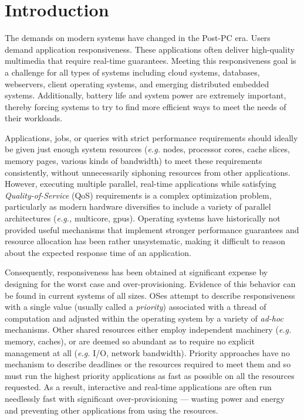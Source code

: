 \section{Introduction}


The demands on modern systems have changed in the Post-PC era.  Users demand application responsiveness. These applications often deliver high-quality multimedia that require real-time guarantees.  Meeting this responsiveness goal is a challenge for all types of systems including cloud systems, databases, webservers, client operating systems, and emerging distributed embedded systems. Additionally, battery life and system power are extremely important, thereby forcing systems to try to find more efficient ways to meet the needs of their workloads.

Applications, jobs, or queries with strict performance requirements should ideally be given just enough system resources (\emph{e.g.} nodes, processor cores, cache slices, memory pages, various kinds of bandwidth) to meet these requirements consistently, without unnecessarily siphoning resources from other applications. However, executing multiple parallel, real-time applications while satisfying  \emph{Quality-of-Service} (QoS) requirements is a complex optimization problem, particularly as modern hardware diversifies to include a variety of parallel architectures (\emph{e.g.,} multicore, gpus).  Operating systems have historically not provided useful mechanisms that implement stronger performance guarantees and resource allocation has been rather unsystematic, making it difficult to reason about the expected response time of an application.

Consequently, responsiveness has been obtained at significant expense by designing for the worst case and over-provisioning.  Evidence of this behavior can be found in current systems of all sizes.  OSes attempt to describe responsiveness with a single value (usually called a \emph{priority}) associated with a thread of computation and adjusted within the operating system by a variety of \emph{ad-hoc} mechanisms. Other shared resources either employ independent machinery (\emph{e.g.} memory, caches), or are deemed so abundant as to require no explicit management at all (\emph{e.g.} I/O, network bandwidth).
 Priority approaches have no mechanism to describe deadlines or the resources required to meet them and so must run the highest priority applications as fast as possible on all the resources requested.   As a result, interactive and real-time applications are often run needlessly fast with significant over-provisioning --- wasting power and energy and preventing other applications from using the resources.

